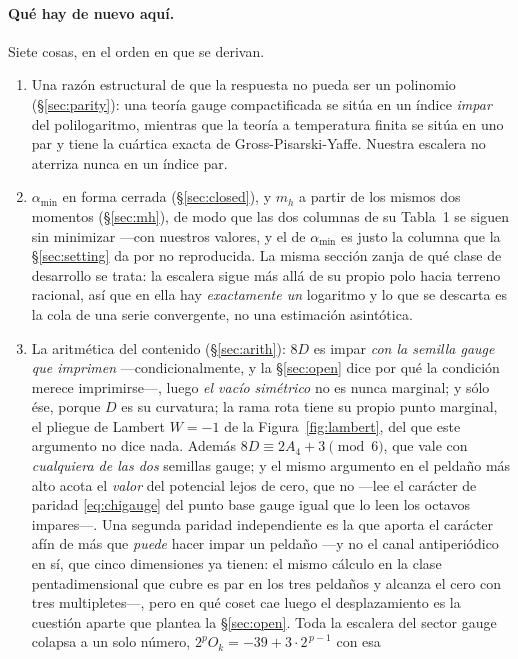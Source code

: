 \documentclass[11pt,a4paper]{article}
\newcommand{\amin}{\alpha_{\min}}
\begin{document}
\paragraph{Qué hay de nuevo aquí.} Siete cosas, en el orden en que se derivan.
\begin{enumerate}\itemsep2pt
\item Una razón estructural de que la respuesta no pueda ser un polinomio (\S\ref{sec:parity}): una
teoría gauge compactificada se sitúa en un índice \emph{impar} del polilogaritmo, mientras que la
teoría a temperatura finita se sitúa en uno par y tiene la cuártica exacta de
Gross-Pisarski-Yaffe. Nuestra escalera no aterriza nunca en un índice par.
\item $\amin$ en forma cerrada (\S\ref{sec:closed}), y $m_h$ a partir de los mismos dos momentos
(\S\ref{sec:mh}), de modo que las dos columnas de su Tabla~1 se siguen sin minimizar ---con
nuestros valores, y el de $\amin$ es justo la columna que la \S\ref{sec:setting} da por no
reproducida. La misma
sección zanja de qué clase de desarrollo se trata: la escalera sigue más allá de su propio polo
hacia terreno racional, así que en ella hay \emph{exactamente un} logaritmo y lo que se descarta es
la cola de una serie convergente, no una estimación asintótica.
\item La aritmética del contenido (\S\ref{sec:arith}): $8D$ es impar \emph{con la semilla gauge
que \cite{KM25} imprimen} ---condicionalmente, y la \S\ref{sec:open} dice por qué la condición
merece imprimirse---, luego \emph{el vacío
simétrico} no es nunca marginal; y sólo ése, porque $D$ es su curvatura; la rama rota tiene su
propio punto marginal, el pliegue de Lambert $W=-1$ de la Figura~\ref{fig:lambert}, del que este
argumento no dice nada. Además $8D\equiv 2A_4+3\pmod 6$, que vale con \emph{cualquiera de las dos} semillas gauge; y el
mismo argumento en el peldaño más alto acota el \emph{valor} del potencial lejos de cero, que no
---lee el carácter de paridad \eqref{eq:chigauge} del punto base gauge igual que lo leen los
octavos impares---. Una segunda paridad independiente es la que aporta el carácter afín de más que \emph{puede} hacer
impar un peldaño ---y no el canal antiperiódico en sí, que cinco dimensiones ya tienen: el mismo
cálculo en la clase pentadimensional que cubre \cite{HY04} es par en los tres peldaños y alcanza el
cero con tres multipletes---, pero en
qué coset cae luego el desplazamiento es la cuestión aparte que plantea la \S\ref{sec:open}. Toda
la escalera del sector gauge colapsa a un solo número, $2^{p}O_k=-39+3\cdot2^{\,p-1}$ con esa

\end{enumerate}
\end{document}
